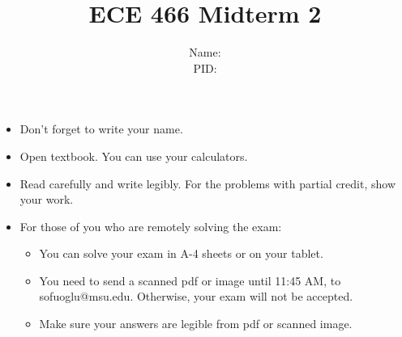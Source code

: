 \documentclass{article}
\begin{document}
 
\title{ECE 466 Midterm 2}
\author{Name: \\PID: }
 
\maketitle
 
\begin{itemize}
    \item Don't forget to write your name.
    \item Open textbook. You can use your calculators.
    \item Read carefully and write legibly. For the problems with partial credit, show your work.
    \item For those of you who are remotely solving the exam: 
    \begin{itemize}
        \item You can solve your exam in A-4 sheets or on your tablet.
        \item You need to send a scanned pdf or image until 11:45 AM, to sofuoglu@msu.edu. Otherwise, your exam will not be accepted.
        \item Make sure your answers are legible from pdf or scanned image. 
    \end{itemize}
\end{itemize}
\end{document}
